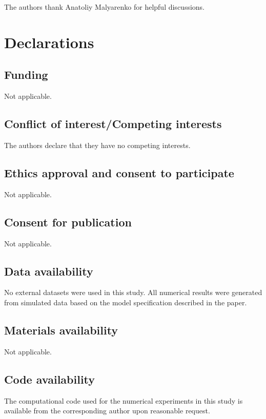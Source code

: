 \documentclass[pdflatex,sn-mathphys-num]{sn-jnl}
\theoremstyle{thmstyleone}%
\theoremstyle{thmstylethree}%
\theoremstyle{thmstyletwo}%
\begin{document}
\backmatter

The authors thank Anatoliy Malyarenko for helpful discussions.

\section*{Declarations}

\subsection*{Funding}
Not applicable.

\subsection*{Conflict of interest/Competing interests}
The authors declare that they have no competing interests.

\subsection*{Ethics approval and consent to participate}
Not applicable.

\subsection*{Consent for publication}
Not applicable.

\subsection*{Data availability}
No external datasets were used in this study. All numerical results were generated from simulated data based on the model specification described in the paper.
\subsection*{Materials availability}
Not applicable.

\subsection*{Code availability}
The computational code used for the numerical experiments in this study is available from the corresponding author upon reasonable request.
\end{document}
